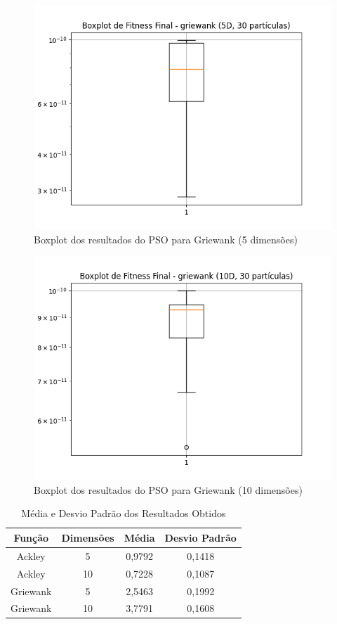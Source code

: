 \documentclass[12pt]{article}
\begin{document}
\begin{figure}[H]
  \centering
  \includegraphics[width=.9\textwidth]{../graphs/boxplot_griewank_5D.png}
  \caption{Boxplot dos resultados do PSO para Griewank (5 dimensões)}
  \label{fig:boxplot_griewank_5d}
\end{figure}

\begin{figure}[H]
  \centering
  \includegraphics[width=.9\textwidth]{../graphs/boxplot_griewank_10D.png}
  \caption{Boxplot dos resultados do PSO para Griewank (10 dimensões)}
  \label{fig:boxplot_griewank_10d}
\end{figure}

\begin{table}[H]
\centering
\caption{Média e Desvio Padrão dos Resultados Obtidos}
\begin{tabular}{|c|c|c|c|}
\hline
\textbf{Função} & \textbf{Dimensões} & \textbf{Média} & \textbf{Desvio Padrão} \\ \hline
Ackley     & 5      & 0{,}9792      & 0{,}1418 \\ \hline
Ackley     & 10     & 0{,}7228      & 0{,}1087 \\ \hline
Griewank   & 5      & 2{,}5463    & 0{,}1992 \\ \hline
Griewank   & 10     & 3{,}7791    & 0{,}1608 \\ \hline
\end{tabular}
\label{tab:resultados}
\end{table}
\end{document}

